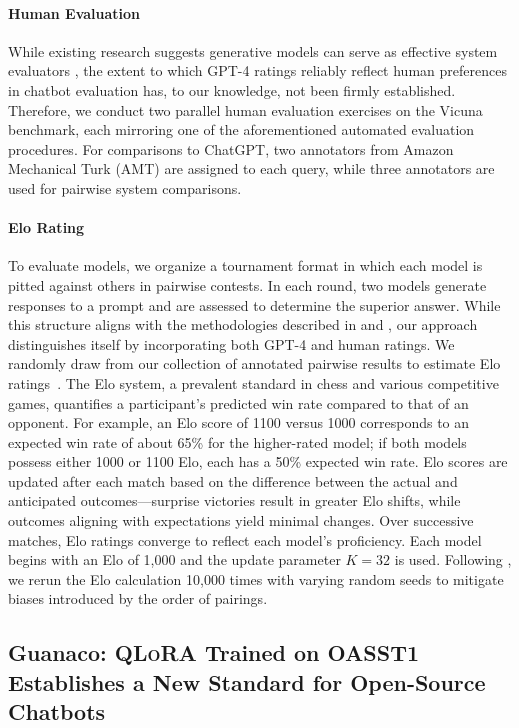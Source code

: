 \paragraph{Human Evaluation} While existing research suggests generative models can serve as effective system evaluators \citep{fu2023gptscore}, the extent to which GPT-4 ratings reliably reflect human preferences in chatbot evaluation has, to our knowledge, not been firmly established. Therefore, we conduct two parallel human evaluation exercises on the Vicuna benchmark, each mirroring one of the aforementioned automated evaluation procedures. For comparisons to ChatGPT, two annotators from Amazon Mechanical Turk (AMT) are assigned to each query, while three annotators are used for pairwise system comparisons.

\paragraph{Elo Rating} To evaluate models, we organize a tournament format in which each model is pitted against others in pairwise contests. In each round, two models generate responses to a prompt and are assessed to determine the superior answer. While this structure aligns with the methodologies described in \citet{bai2022training} and \citet{vicuna2023}, our approach distinguishes itself by incorporating both GPT-4 and human ratings. We randomly draw from our collection of annotated pairwise results to estimate Elo ratings~\citep{elo1967proposed,elo1978rating}. The Elo system, a prevalent standard in chess and various competitive games, quantifies a participant’s predicted win rate compared to that of an opponent. For example, an Elo score of 1100 versus 1000 corresponds to an expected win rate of about 65\% for the higher-rated model; if both models possess either 1000 or 1100 Elo, each has a 50\% expected win rate. Elo scores are updated after each match based on the difference between the actual and anticipated outcomes—surprise victories result in greater Elo shifts, while outcomes aligning with expectations yield minimal changes. Over successive matches, Elo ratings converge to reflect each model's proficiency. Each model begins with an Elo of 1,000 and the update parameter $K=32$ is used. Following \citet{vicuna2023}, we rerun the Elo calculation 10,000 times with varying random seeds to mitigate biases introduced by the order of pairings.

\subsection{\textbf{Guanaco}: \textsc{QLoRA} Trained on OASST1 Establishes a New Standard for Open-Source Chatbots}

